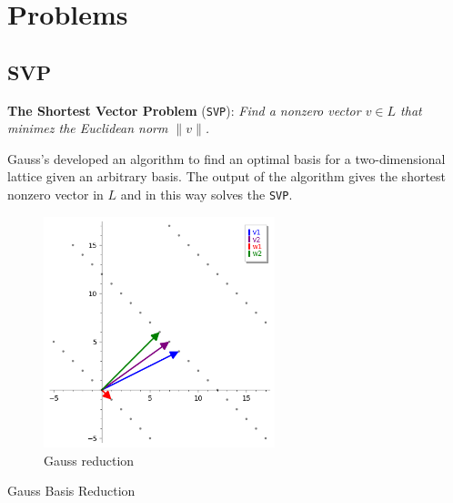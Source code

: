 \documentclass[a4paper,12pt]{report}
\begin{document}
\clearpage

\section{Problems}

\subsection{SVP}

\textbf{The Shortest Vector Problem} (\texttt{SVP}): \textit{Find a nonzero vector $v \in L$ that minimez the Euclidean norm $\lVert v \rVert$.}

Gauss's developed an algorithm to find an optimal basis for a two-dimensional lattice given an arbitrary basis. The output of the algorithm
gives the shortest nonzero vector in $L$ and in this way solves the \texttt{SVP}.

\begin{figure}[!b]
    \centering
    \includegraphics[width=0.6\textwidth]{./img/gauss_svp.png}
    \caption{Gauss reduction}
    \label{fig:gauss_svp}
\end{figure}

\begin{algorithm}[H]
    \vspace*{5px}
    \caption{Gauss Basis Reduction}
\end{algorithm}
\end{document}
